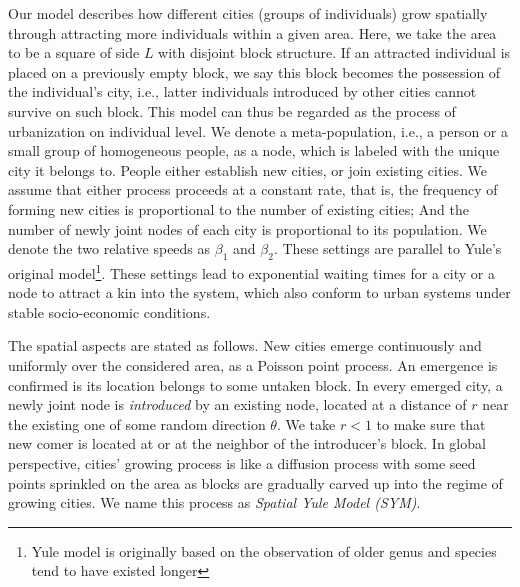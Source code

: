 \documentclass[reprint,unsortedaddress,amsmath,amssymb,aps,prl,showkeys]{revtex4-2}
\begin{document}
Our model describes how different cities (groups of individuals) grow spatially through attracting more individuals within a given area. Here, we take the area to be a square of side $L$ with disjoint block structure. If an attracted individual is placed on a previously empty block, we say this block becomes the possession of the individual's city, i.e., latter individuals introduced by other cities cannot survive on such block. This model can thus be regarded as the process of urbanization on individual level. We denote a meta-population, i.e., a person or a small group of homogeneous people, as a node, which is labeled with the unique city it belongs to. People either establish new cities, or join existing cities. We assume that either process proceeds at a constant rate, that is, the frequency of forming new cities is proportional to the number of existing cities; And the number of newly joint nodes of each city is proportional to its population. We denote the two relative speeds as $\beta_1$ and $\beta_2$. These settings are parallel to Yule's original model\cite{yule1925ii}\footnote{Yule model is originally based on the observation of older genus and species tend to have existed longer}. These settings lead to exponential waiting times for a city or a node to attract a kin into the system, which also conform to urban systems under stable socio-economic conditions. 

The spatial aspects are stated as follows. New cities emerge continuously and uniformly over the considered area, as a Poisson point process\cite{miles1970homogeneous}. An emergence is confirmed is its location belongs to some untaken block. In every emerged city, a newly joint node is \emph{introduced} by an existing node, located at a distance of $r$ near the existing one of some random direction $\theta$. We take $r < 1$ to make sure that new comer is located at or at the neighbor of the introducer's block. In global perspective, cities' growing process is like a diffusion process\cite{RevModPhys.87.925} with some seed points sprinkled on the area as blocks are gradually carved up into the regime of growing cities. We name this process as \emph{Spatial Yule Model (SYM)}.
\end{document}

